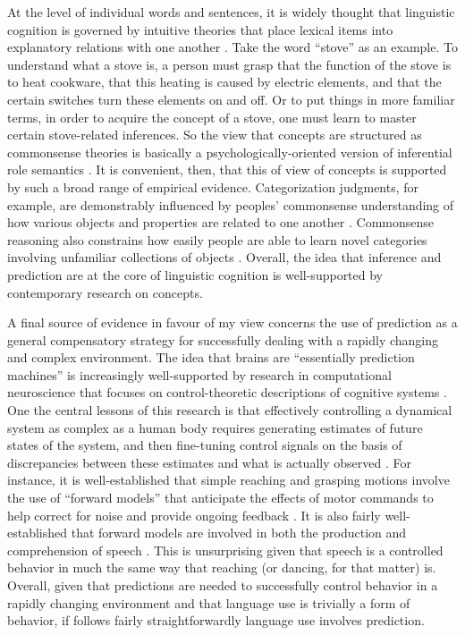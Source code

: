 At the level of individual words and sentences, it is widely thought that linguistic cognition is governed by intuitive theories that place lexical items into explanatory relations with one another \citep{Murphy:1985,MargolisLaurence:1999}. Take the word ``stove'' as an example. To understand what a stove is, a person must grasp that the function of the stove is to heat cookware, that this heating is caused by electric elements, and that the certain switches turn these elements on and off. Or to put things in more familiar terms, in order to acquire the concept of a stove, one must learn to master certain stove-related inferences. So the view that concepts are structured as commonsense theories is basically a psychologically-oriented version of inferential role semantics \citep{Fodor:1998}. It is convenient, then, that this of view of concepts is supported by such a broad range of empirical evidence. Categorization judgments, for example, are demonstrably influenced by peoples' commonsense understanding of how various objects and properties are related to one another \citep{LinMurphy:1997, Murphy:1985}. Commonsense reasoning also constrains how easily people are able to learn novel categories involving unfamiliar collections of objects \citep{Murphy:1985}. Overall, the idea that inference and prediction are at the core of linguistic cognition is well-supported by contemporary research on concepts. 

A final source of evidence in favour of my view concerns the use of prediction as a general compensatory strategy for successfully dealing with a rapidly changing and complex environment. The idea that brains are ``essentially prediction machines'' \citep[][p. 181]{clark:2013} is increasingly well-supported by research in computational neuroscience that focuses on control-theoretic descriptions of cognitive systems \citep{Eliasmith:2013,Grush:2004,Eliasmith:2010,EliasmithAnderson:2003}. One the central lessons of this research is that effectively controlling a dynamical system as complex as a human body requires generating estimates of future states of the system, and then fine-tuning control signals on the basis of discrepancies between these estimates and what is actually observed \citep{Grush:2004,Pickering:2013,Pickering:2007}. For instance, it is well-established that simple reaching and grasping motions involve the use of ``forward models'' that anticipate the effects of motor commands to help correct for noise and provide ongoing feedback \citep{Pickering:2013,Pickering:2007}. It is also fairly well-established that forward models are involved in both the production and comprehension of speech \citep{Pickering:2013,Pickering:2007}. This is unsurprising given that speech is a controlled behavior in much the same way that reaching (or dancing, for that matter) is. Overall, given that predictions are needed to successfully control behavior in a rapidly changing environment and that language use is trivially a form of behavior, if follows fairly straightforwardly language use involves prediction. 

